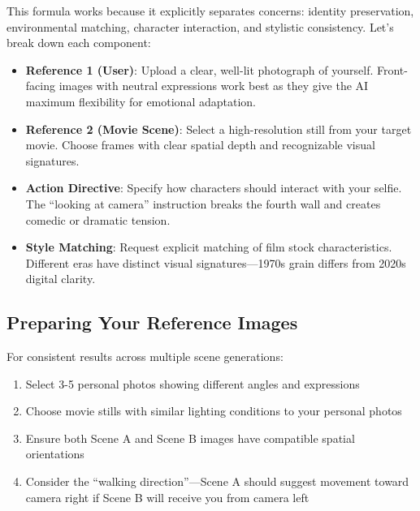This formula works because it explicitly separates concerns: identity preservation, environmental matching, character interaction, and stylistic consistency. Let's break down each component:

\begin{itemize}
\item \textbf{Reference 1 (User)}: Upload a clear, well-lit photograph of yourself. Front-facing images with neutral expressions work best as they give the AI maximum flexibility for emotional adaptation.

\item \textbf{Reference 2 (Movie Scene)}: Select a high-resolution still from your target movie. Choose frames with clear spatial depth and recognizable visual signatures.

\item \textbf{Action Directive}: Specify how characters should interact with your selfie. The ``looking at camera'' instruction breaks the fourth wall and creates comedic or dramatic tension.

\item \textbf{Style Matching}: Request explicit matching of film stock characteristics. Different eras have distinct visual signatures—1970s grain differs from 2020s digital clarity.
\end{itemize}

\subsection{Preparing Your Reference Images}

For consistent results across multiple scene generations:

\begin{enumerate}
\item Select 3-5 personal photos showing different angles and expressions
\item Choose movie stills with similar lighting conditions to your personal photos
\item Ensure both Scene A and Scene B images have compatible spatial orientations
\item Consider the ``walking direction''—Scene A should suggest movement toward camera right if Scene B will receive you from camera left
\end{enumerate}

